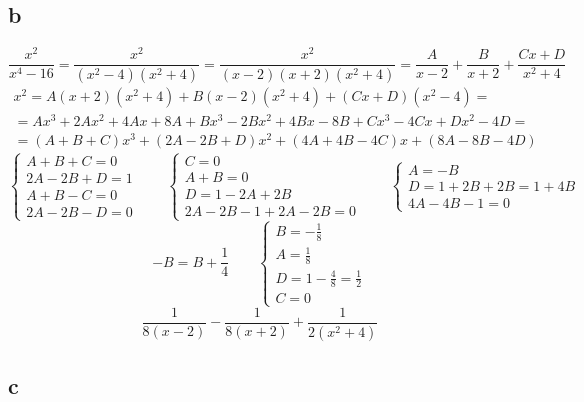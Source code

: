 \subsection{b}

$$ \frac{x^2}{x^4 - 16} = \frac{x^2}{(x^2 - 4)(x^2 + 4)} = \frac{x^2}{(x - 2)(x + 2)(x^2 + 4)} = \frac{A}{x - 2} + \frac{B}{x + 2} + \frac{Cx + D}{x^2 + 4} $$
\begin{multline*}
    x^2 = A(x + 2)(x^2 + 4) + B(x - 2)(x^2 + 4) + (Cx + D)(x^2 - 4) = \\
    = Ax^3 + 2Ax^2 + 4Ax + 8A + Bx^3 - 2Bx^2 + 4Bx - 8B + Cx^3 - 4Cx + Dx^2 - 4D = \\
    = (A + B + C)x^3 + (2A - 2B + D)x^2 + (4A + 4B - 4C)x + (8A - 8B - 4D)
\end{multline*}
$$
\begin{cases}
	A + B + C = 0 \\
    2A - 2B + D = 1 \\
    A + B - C = 0 \\
    2A - 2B - D = 0
\end{cases} \qquad
\begin{cases}
	C = 0 \\
    A + B = 0 \\
    D = 1 - 2A + 2B \\
    2A - 2B - 1 + 2A - 2B = 0
\end{cases} \qquad
\begin{cases}
	A = -B \\
    D = 1 + 2B + 2B = 1 + 4B \\
    4A - 4B - 1 = 0
\end{cases} $$
$$ -B = B + \frac14 \qquad
\begin{cases}
	B = -\frac18 \\
    A = \frac18 \\
    D = 1 - \frac48 = \frac12 \\
    C = 0
\end{cases} $$
$$ \frac1{8(x - 2)} - \frac1{8(x + 2)} + \frac1{2(x^2 + 4)} $$

\subsection{c}

